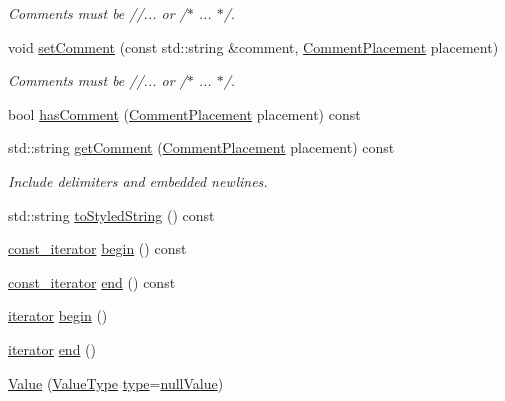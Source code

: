 \begin{DoxyCompactItemize}
\begin{DoxyCompactList}\small\item\em Comments must be //... or /$\ast$ ... $\ast$/. \end{DoxyCompactList}\item 
void \hyperlink{classJson_1_1Value_a6d68a2e7d4e1e317cd9e812e12181689}{set\-Comment} (const std\-::string \&comment, \hyperlink{namespaceJson_a4fc417c23905b2ae9e2c47d197a45351}{Comment\-Placement} placement)
\begin{DoxyCompactList}\small\item\em Comments must be //... or /$\ast$ ... $\ast$/. \end{DoxyCompactList}\item 
bool \hyperlink{classJson_1_1Value_a06567a00363cab9601be7e31336db03a}{has\-Comment} (\hyperlink{namespaceJson_a4fc417c23905b2ae9e2c47d197a45351}{Comment\-Placement} placement) const 
\item 
std\-::string \hyperlink{classJson_1_1Value_aa1e105b5d7f55d6e42f4fb2f3674116f}{get\-Comment} (\hyperlink{namespaceJson_a4fc417c23905b2ae9e2c47d197a45351}{Comment\-Placement} placement) const 
\begin{DoxyCompactList}\small\item\em Include delimiters and embedded newlines. \end{DoxyCompactList}\item 
std\-::string \hyperlink{classJson_1_1Value_a05357cf78959b790337fae4e5580ee4f}{to\-Styled\-String} () const 
\item 
\hyperlink{classJson_1_1Value_af92282ca92b58b320debd486afb7696a}{const\-\_\-iterator} \hyperlink{classJson_1_1Value_a9d4b9cb50bd804b130c56c44e82cbf3c}{begin} () const 
\item 
\hyperlink{classJson_1_1Value_af92282ca92b58b320debd486afb7696a}{const\-\_\-iterator} \hyperlink{classJson_1_1Value_a496b70a676b2feb850af1c94df44fc14}{end} () const 
\item 
\hyperlink{classJson_1_1Value_a341cdf2e01f8b3c5b7317aa2f0768c53}{iterator} \hyperlink{classJson_1_1Value_acec156770bf554bee85279825d046fad}{begin} ()
\item 
\hyperlink{classJson_1_1Value_a341cdf2e01f8b3c5b7317aa2f0768c53}{iterator} \hyperlink{classJson_1_1Value_a2ac91976a65644bde515280767c7bcde}{end} ()
\item 
\hyperlink{classJson_1_1Value_ada6ba1369448fb0240bccc36efaa46f7}{Value} (\hyperlink{namespaceJson_a7d654b75c16a57007925868e38212b4e}{Value\-Type} \hyperlink{classJson_1_1Value_a695ef31fad36b4712918b3ff80158479}{type}=\hyperlink{namespaceJson_a7d654b75c16a57007925868e38212b4ea99922f3ccd58446e80e6055a7119b640}{null\-Value})

\end{DoxyCompactItemize}
